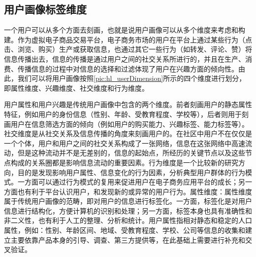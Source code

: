		\subsection{用户画像标签维度}
	    一个用户可以从多个方面去刻画，也就是说用户画像可以从多个维度来考虑和构建。作为虚拟电子商品交易平台，电子商务市场的用户在平台上通过某些行为（点击、浏览、购买）生产或获取信息，也通过其它一些行为（如转发、评论、赞）将信息传播出去，信息的传播是通过用户之间的社交关系所进行的，并且在生产、消费、传播信息的过程中对信息的选择和过滤体现了用户在兴趣方面的倾向性。由此，我们可以将用户画像按照\autoref{pic:hl_userDimension}所示的四个维度进行划分，即属性维度、兴趣维度、社交维度和行为维度。
	    \begin{figure}
	    \centering
	      \label{pic:hl_userDimension}
	    \end{figure}
	    用户属性和用户兴趣是传统用户画像中包含的两个维度。前者刻画用户的静态属性特征，例如用户的身份信息（性别、年龄、受教育程度、学校等），后者则用于刻画用户在信息筛选方面的倾向（例如用户的购买能力、兴趣标签、能力标签等）。社交维度是从社交关系及信息传播的角度来刻画用户的。在社区中用户不在仅仅是一个个体，用户和用户之间的社交关系构成了一张网络，信息在这张网络中高速流动，但是这种流动并不是无差别的，信息的起始点，所经历的关键节点以及这些节点构成的关系圈都是影响信息流动的重要因素。行为维度是一个比较新的研究方向，目的是发现影响用户属性、信息变化的行为因素，分析典型用户群体的行为模式。一方面可以通过行为模式的复用来促进用户在电子商务应用平台的成长；另一方面也有利于平台认识用户，和发现新的或异常的用户行为。属性维度：属性维度属于传统用户画像的范畴，即对用户的信息进行标签化。一方面，标签化是对用户信息进行结构化，方便计算机的识别和处理；另一方面，标签本身也具有准确性和非二义性，也有利于人工的整理、分析和统计。用户属性指相对静态和稳定的人口属性，例如：性别、年龄区间、地域、受教育程度、学校、公司等信息的收集和建立主要依靠产品本身的引导、调查、第三方提供等，在此基础上需要进行补充和交叉验证。
